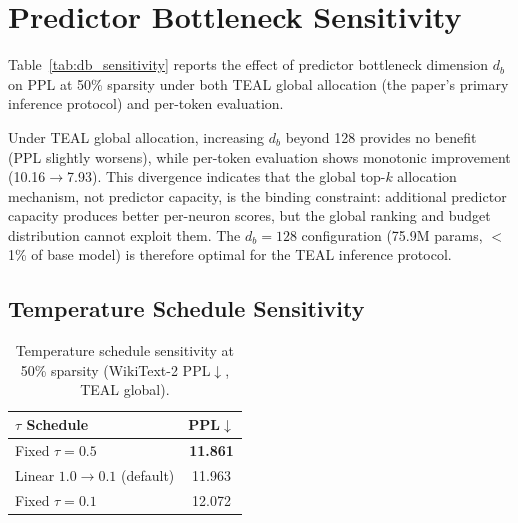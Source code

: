 \section{Predictor Bottleneck Sensitivity}
\label{app:db_sensitivity}

Table~\ref{tab:db_sensitivity} reports the effect of predictor bottleneck dimension $d_b$ on PPL at 50\% sparsity under both TEAL global allocation (the paper's primary inference protocol) and per-token evaluation.

\begin{table}[h]
\centering
\caption{Predictor bottleneck sensitivity at 50\% sparsity (WikiText-2 PPL$\downarrow$). TEAL global is the primary inference protocol; per-token shown for reference.}
\label{tab:db_sensitivity}
\end{table}

Under TEAL global allocation, increasing $d_b$ beyond 128 provides no benefit (PPL slightly worsens), while per-token evaluation shows monotonic improvement (10.16$\to$7.93).
This divergence indicates that the global top-$k$ allocation mechanism, not predictor capacity, is the binding constraint: additional predictor capacity produces better per-neuron scores, but the global ranking and budget distribution cannot exploit them.
The $d_b{=}128$ configuration (75.9M params, $<$1\% of base model) is therefore optimal for the TEAL inference protocol.

\subsection{Temperature Schedule Sensitivity}
\label{app:tau_sensitivity}

\begin{table}[h]
\centering
\caption{Temperature schedule sensitivity at 50\% sparsity (WikiText-2 PPL$\downarrow$, TEAL global).}
\label{tab:tau_sensitivity}
\small
\begin{tabular}{lc}
\toprule
$\tau$ Schedule & PPL$\downarrow$ \\
\midrule
Fixed $\tau{=}0.5$ & \textbf{11.861} \\ %
Linear $1.0 \to 0.1$ (default) & 11.963 \\ %
Fixed $\tau{=}0.1$ & 12.072 \\ %
\bottomrule
\end{tabular}
\end{table}

